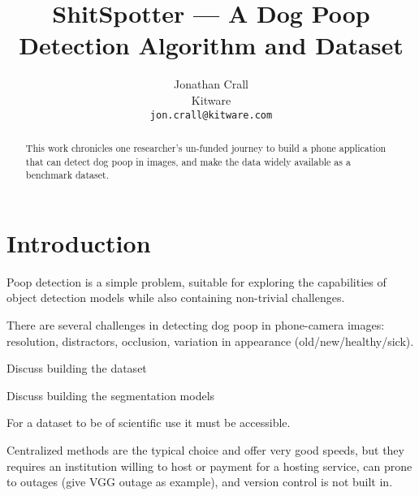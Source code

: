 \documentclass[10pt,twocolumn,letterpaper]{article}
\begin{document}
\title{ShitSpotter --- A Dog Poop Detection Algorithm and Dataset}

\author{Jonathan Crall\\
Kitware\\
{\tt\small jon.crall@kitware.com}
}
\maketitle

\begin{abstract}

    This work chronicles one researcher's un-funded journey to build a phone
    application that can detect dog poop in images, and make the data widely
    available as a benchmark dataset.


\end{abstract}

\section{Introduction}
\label{sec:intro}


Poop detection is a simple problem, suitable for exploring the capabilities of
object detection models while also containing non-trivial challenges.

There are several challenges in detecting dog poop in phone-camera images:
resolution,
distractors,
occlusion,
variation in appearance (old/new/healthy/sick).

Discuss building the dataset

Discuss building the segmentation models

For a dataset to be of scientific use it must be accessible. 

Centralized methods are the typical choice and offer very good speeds, 
but they requires an institution willing to host or payment for a hosting service,
can prone to outages (give VGG outage as example),
and version control is not built in.
\end{document}
